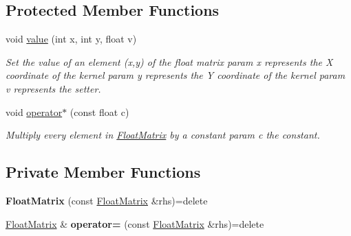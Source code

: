 \subsection*{Protected Member Functions}
\begin{DoxyCompactItemize}
\item 
void \hyperlink{classimage__tools_1_1FloatMatrix_a0dd21317c305181c044f2806d4b05d9b}{value} (int x, int y, float v)\hypertarget{classimage__tools_1_1FloatMatrix_a0dd21317c305181c044f2806d4b05d9b}{}\label{classimage__tools_1_1FloatMatrix_a0dd21317c305181c044f2806d4b05d9b}

\begin{DoxyCompactList}\small\item\em Set the value of an element (x,y) of the float matrix param x represents the X coordinate of the kernel param y represents the Y coordinate of the kernel param v represents the setter. \end{DoxyCompactList}\item 
void \hyperlink{classimage__tools_1_1FloatMatrix_a5bd3e5b9ed8dbf2368abc8d9d703a705}{operator$\ast$} (const float c)\hypertarget{classimage__tools_1_1FloatMatrix_a5bd3e5b9ed8dbf2368abc8d9d703a705}{}\label{classimage__tools_1_1FloatMatrix_a5bd3e5b9ed8dbf2368abc8d9d703a705}

\begin{DoxyCompactList}\small\item\em Multiply every element in \hyperlink{classimage__tools_1_1FloatMatrix}{Float\+Matrix} by a constant param c the constant. \end{DoxyCompactList}\end{DoxyCompactItemize}
\subsection*{Private Member Functions}
\begin{DoxyCompactItemize}
\item 
{\bfseries Float\+Matrix} (const \hyperlink{classimage__tools_1_1FloatMatrix}{Float\+Matrix} \&rhs)=delete\hypertarget{classimage__tools_1_1FloatMatrix_aa98a295ec659021b206cf46a046a6c2e}{}\label{classimage__tools_1_1FloatMatrix_aa98a295ec659021b206cf46a046a6c2e}

\item 
\hyperlink{classimage__tools_1_1FloatMatrix}{Float\+Matrix} \& {\bfseries operator=} (const \hyperlink{classimage__tools_1_1FloatMatrix}{Float\+Matrix} \&rhs)=delete\hypertarget{classimage__tools_1_1FloatMatrix_abcc8a0e6f9ebf537d7c356dafda3e61d}{}\label{classimage__tools_1_1FloatMatrix_abcc8a0e6f9ebf537d7c356dafda3e61d}

\end{DoxyCompactItemize}
